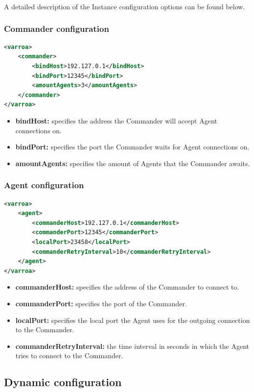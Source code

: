 A detailed description of the Instance configuration options can be found below.

\subsubsection{Commander configuration}\label{sec:commanderConfig}
\begin{lstlisting}[caption={Commander XML configuration example}, captionpos=b, label={lst:commanderConfig}, language=XML]
<varroa>
    <commander>
		<bindHost>192.127.0.1</bindHost>
        <bindPort>12345</bindPort>
        <amountAgents>3</amountAgents>
    </commander>
</varroa>
\end{lstlisting}
\begin{itemize}
	\item \textbf{bindHost:} specifies the address the Commander will accept Agent connections on.
	\item \textbf{bindPort:} specifies the port the Commander waits for Agent connections on.
	\item \textbf{amountAgents:} specifies the amount of Agents that the Commander awaits.
\end{itemize}
\newpage
\subsubsection{Agent configuration}\label{sec:agentConfig}
\begin{lstlisting}[caption={Agent XML configuration example}, captionpos=b, label={lst:agentConfig}, language=XML]
<varroa>
    <agent>
		<commanderHost>192.127.0.1</commanderHost>
        <commanderPort>12345</commanderPort>
        <localPort>23458</localPort>
		<commanderRetryInterval>10</commanderRetryInterval>
    </agent>
</varroa>
\end{lstlisting}
\begin{itemize}
	\item \textbf{commanderHost:} specifies the address of the Commander to connect to.
	\item \textbf{commanderPort:} specifies the port of the Commander.
	\item \textbf{localPort:} specifies the local port the Agent uses for the outgoing connection to the Commander.
	\item \textbf{commanderRetryInterval:} the time interval in seconds in which the Agent tries to connect to the Commander.
\end{itemize}
\newpage
\subsection{Dynamic configuration}


